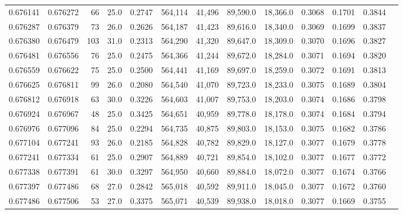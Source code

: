 \begin{tabular}{rrrrrrrrrrrrr}
0.676141 & 0.676272 &    66 & 25.0 &                                     0.2747 & 564,114 &  41,496 &  89,590.0 &  18,366.0 & 0.3068 & 0.1701 & 0.3844 \\
0.676287 & 0.676379 &    73 & 26.0 &                                     0.2626 & 564,187 &  41,423 &  89,616.0 &  18,340.0 & 0.3069 & 0.1699 & 0.3837 \\
0.676380 & 0.676479 &   103 & 31.0 &                                     0.2313 & 564,290 &  41,320 &  89,647.0 &  18,309.0 & 0.3070 & 0.1696 & 0.3827 \\
0.676481 & 0.676556 &    76 & 25.0 &                                     0.2475 & 564,366 &  41,244 &  89,672.0 &  18,284.0 & 0.3071 & 0.1694 & 0.3820 \\
0.676559 & 0.676622 &    75 & 25.0 &                                     0.2500 & 564,441 &  41,169 &  89,697.0 &  18,259.0 & 0.3072 & 0.1691 & 0.3813 \\
0.676625 & 0.676811 &    99 & 26.0 &                                     0.2080 & 564,540 &  41,070 &  89,723.0 &  18,233.0 & 0.3075 & 0.1689 & 0.3804 \\
0.676812 & 0.676918 &    63 & 30.0 &                                     0.3226 & 564,603 &  41,007 &  89,753.0 &  18,203.0 & 0.3074 & 0.1686 & 0.3798 \\
0.676924 & 0.676967 &    48 & 25.0 &                                     0.3425 & 564,651 &  40,959 &  89,778.0 &  18,178.0 & 0.3074 & 0.1684 & 0.3794 \\
0.676976 & 0.677096 &    84 & 25.0 &                                     0.2294 & 564,735 &  40,875 &  89,803.0 &  18,153.0 & 0.3075 & 0.1682 & 0.3786 \\
0.677104 & 0.677241 &    93 & 26.0 &                                     0.2185 & 564,828 &  40,782 &  89,829.0 &  18,127.0 & 0.3077 & 0.1679 & 0.3778 \\
0.677241 & 0.677334 &    61 & 25.0 &                                     0.2907 & 564,889 &  40,721 &  89,854.0 &  18,102.0 & 0.3077 & 0.1677 & 0.3772 \\
0.677338 & 0.677391 &    61 & 30.0 &                                     0.3297 & 564,950 &  40,660 &  89,884.0 &  18,072.0 & 0.3077 & 0.1674 & 0.3766 \\
0.677397 & 0.677486 &    68 & 27.0 &                                     0.2842 & 565,018 &  40,592 &  89,911.0 &  18,045.0 & 0.3077 & 0.1672 & 0.3760 \\
0.677486 & 0.677506 &    53 & 27.0 &                                     0.3375 & 565,071 &  40,539 &  89,938.0 &  18,018.0 & 0.3077 & 0.1669 & 0.3755 \\

\end{tabular}
